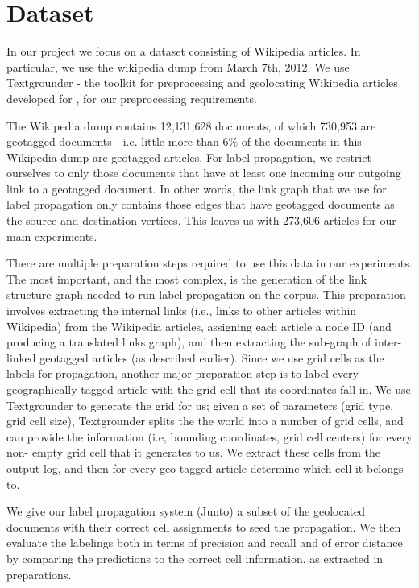 \section{Dataset} 
\par In our project we focus on a dataset consisting of
Wikipedia articles. In particular, we use the wikipedia dump from March
7th, 2012. We use Textgrounder - the toolkit for preprocessing and geolocating
Wikipedia articles developed for \cite{wing-baldridge:11}, for our
preprocessing requirements.

\par The Wikipedia dump contains 12,131,628 documents,  of which 730,953 are geotagged documents -
i.e. little more than 6\% of the documents in this Wikipedia dump are
geotagged articles.  For label propagation, we restrict ourselves to only
those documents that have at least one incoming our outgoing link to a
geotagged document. In other words, the link graph that we use for label
propagation only contains those edges that have geotagged documents as the
source and destination vertices. This leaves us with 273,606 articles for our
main experiments.

\par There are multiple preparation steps required to use this data in our
experiments. The most important, and the most complex, is the generation of
the  link structure graph needed to run label propagation on the corpus. This
preparation involves extracting the internal links (i.e., links to other
articles within Wikipedia)  from the Wikipedia articles, assigning each
article a node ID (and producing a translated links  graph), and then
extracting the sub-graph of inter-linked geotagged articles (as  described
earlier). Since we use grid cells as the labels for propagation,  another
major preparation step is to label every geographically tagged article  with
the grid cell that its coordinates fall in. We use Textgrounder to generate the
grid for us;  given a set of parameters (grid type, grid cell size),
Textgrounder splits the the world into a number of grid cells, and can provide
the information (i.e, bounding coordinates, grid cell centers) for every  non-
empty grid cell that it generates to us. We extract these cells from the
output  log, and then for every geo-tagged article determine which cell it
belongs to.

\par 
We give our label propagation system (Junto) a subset of the geolocated
documents with their correct cell assignments to seed the propagation. We then
evaluate the labelings both in terms of precision and recall and of error
distance by comparing the predictions to the correct cell information, as
extracted in preparations.

